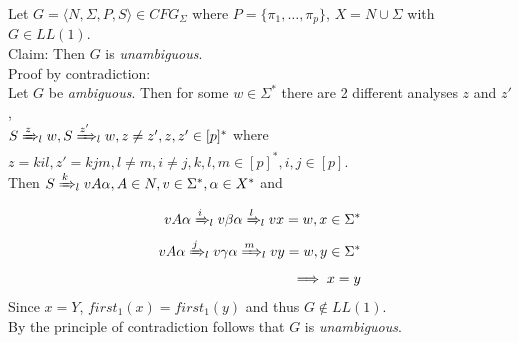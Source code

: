 Let $G = \langle N, \Sigma , P, S \rangle \in CFG_\Sigma$ where $P = \{\pi_1, \dots ,  \pi_p \}$, $X = N \cup \Sigma$ with $G \in LL(1)$.\\
Claim: Then $G$ is \emph{unambiguous}.\\[1ex]
Proof by contradiction:\\
Let $G$ be \emph{ambiguous}. Then for some $w \in \Sigma^{*}$ there are 2 different analyses $z$ and $z'$,\\
$S \xRightarrow{z}{}_{\hspace{-3pt} l}\; w, S \xRightarrow{z'}{}_{\hspace{-3pt} l}\; w, z \neq z', z, z' \in [p]^{*}$ where \\
$z = kil, z' = kjm, l \neq m, i \neq j, k, l, m \in [p]^{*}, i, j \in [p]$.\\
Then $S \xRightarrow{k}{}_{\hspace{-3pt} l}\; vA\alpha , A \in N, v \in \Sigma^{*}, \alpha \in X^{*}$ and\\
\begin{equation*}\begin{split}
vA\alpha \xRightarrow{i}{}_{\hspace{-3pt} l}\; v\beta\alpha \xRightarrow{l}{}_{\hspace{-3pt} l}\; vx = w, x \in \Sigma^{*}\\
vA\alpha \xRightarrow{j}{}_{\hspace{-3pt} l}\; v\gamma\alpha \xRightarrow{m}{}_{\hspace{-3pt} l}\; vy = w, y \in \Sigma^{*}\\
\implies x = y
\end{split}\end{equation*}
Since $x = Y$, $first_1(x) = first_1(y)$ and thus $G \not\in LL(1)$. \quad\Lightning\\[1ex]
By the principle of contradiction follows that $G$ is \emph{unambiguous}.